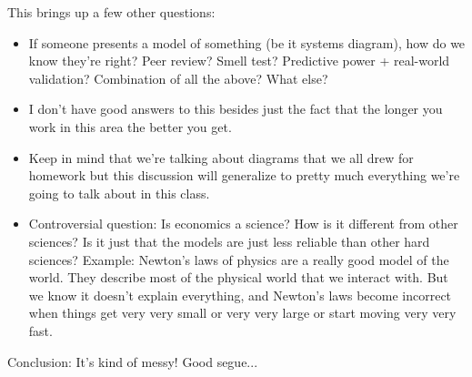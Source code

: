 \documentclass[11pt]{article}
\begin{document}
This brings up a few other questions:
\begin{itemize}
    \item If someone presents a model of something (be it systems diagram), how do we know they're right? Peer review? Smell test? Predictive power + real-world validation? Combination of all the above? What else?
    \item I don't have good answers to this besides just the fact that the longer you work in this area the better you get.  
    \item Keep in mind that we're talking about diagrams that we all drew for homework but this discussion will generalize to pretty much everything we're going to talk about in this class. 
    \item Controversial question: Is economics a science? How is it different from other sciences? Is it just that the models are just less reliable than other hard sciences? Example: Newton's laws of physics are a really good model of the world. They describe most of the physical world that we interact with. But we know it doesn't explain everything, and Newton's laws become incorrect when things get very very small or very very large or start moving very very fast. 
\end{itemize}


Conclusion: It's kind of messy! Good segue...




\end{document}
